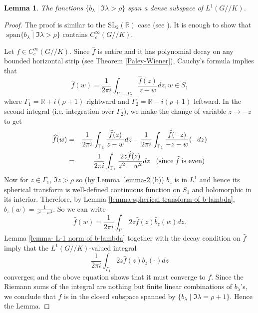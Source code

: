 \documentclass[11pt,reqno]{amsart}
\newcommand{\what}{\widehat}%
\newtheorem{lemma}[theorem]{Lemma}
\theoremstyle{definition}
\theoremstyle{definition}
\numberwithin{equation}{section}
\begin{document}
\begin{lemma}\label{denseness of b-lambda}
The functions $\{b_\lambda\mid \Im\lambda>\rho\}$ span a dense subspace of $L^1(G//K)$.
\end{lemma}
\begin{proof}
The proof is similar to the $\mathrm{SL}_2(\mathbb{R})$ case (see \cite[Lemma 3.2]{Ben-2}).   It is enough to show that    $\overline{\text{ span}\{b_\lambda\mid \Im\lambda>\rho\}}$ contains $C_c^\infty(G//K)$.
 
 Let $f\in C_c^\infty(G//K)$. Since $\what{f}$ is entire and it has polynomial decay on any bounded horizontal strip (see Theorem \ref{Paley-Wiener}), Cauchy's formula implies that
$$
\widehat{f}(w)=\frac{1}{2\pi i}\int_{\Gamma_1+\Gamma_2}\frac{\widehat{f}(z)}{z-w}dz, w\in S_1
$$
where $\Gamma_1=\mathbb{R}+i(\rho+ 1)$ rightward and $\Gamma_2=\mathbb{R}-i(\rho+ 1)$ leftward. In the second integral (i.e. integration over $\Gamma_2$), we make the change of variable $z\rightarrow -z$ to get 
\begin{eqnarray*}
\widehat{f}(w)&=&\frac{1}{2\pi i}\int_{\Gamma_1}\frac{\widehat{f}(z)}{z-w}dz+\frac{1}{2\pi i}\int_{\Gamma_1}\frac{\widehat{f}(-z)}{-z-w}(-dz)\\
&=& \frac{1}{2\pi i}\int_{\Gamma_1}\frac{2z\widehat{f}(z)}{z^2-w^2}dz \hspace{3mm}\textup{(since}\hspace{1mm}\widehat{f}\hspace{1mm}\textup{is even) }
\end{eqnarray*}
Now for $z\in\Gamma_1$, $\Im z>\rho$ so (by Lemma \ref{lemma-2}(b)) $b_z$ is in $L^1$ and hence its spherical transform is well-defined continuous function on $ S_1$ and holomorphic in its interior. Therefore, by Lemma \ref{lemma-spherical transform of b-lambda}, $\widehat{b}_z(w)=\frac{1}{z^2-w^2}$. So we can write 
$$
\widehat{f}(w)=\frac{1}{2\pi i}\int_{\Gamma_1}2z\widehat{f}(z)\widehat{b}_z(w)dz.
$$
Lemma \ref{lemma- L-1 norm of b-lambda} together with the decay condition on $\widehat{f}$ imply that the $L^1(G//K)$-valued integral
$$
\frac{1}{2\pi i}\int_{\Gamma_1}2z\widehat{f}(z)b_z(\cdot)dz
$$ converges; and the above equation shows that it must converge to $f$. Since the Riemann sums of the integral are nothing but finite linear combinations of $b_\lambda$'s, we conclude that $f$ is in the closed subspace spanned by $\{b_\lambda\mid \Im\lambda =\rho +1\}$. Hence the Lemma.
\end{proof}
\end{document}
